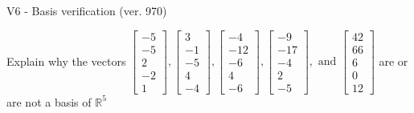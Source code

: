 \begin{exercise}
  \begin{exerciseTitle}V6 - Basis verification (ver. 970)\end{exerciseTitle}
  \begin{exerciseStatement}
    Explain why the vectors \(\left[\begin{array}{r}
-5 \\
-5 \\
2 \\
-2 \\
1
\end{array}\right] , \left[\begin{array}{r}
3 \\
-1 \\
-5 \\
4 \\
-4
\end{array}\right] , \left[\begin{array}{r}
-4 \\
-12 \\
-6 \\
4 \\
-6
\end{array}\right] , \left[\begin{array}{r}
-9 \\
-17 \\
-4 \\
2 \\
-5
\end{array}\right] , \text{ and } \left[\begin{array}{r}
42 \\
66 \\
6 \\
0 \\
12
\end{array}\right]\) are or are not a basis of \(\mathbb{R}^5\)	



\end{exerciseStatement}
\end{exercise}
